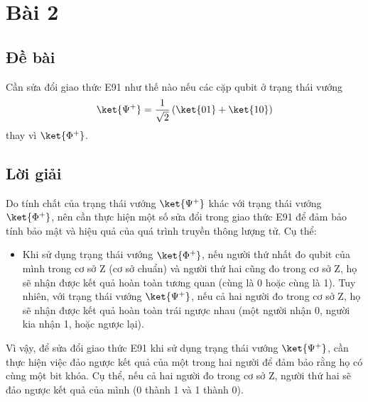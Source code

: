 \section{Bài 2}

\subsection{Đề bài}

Cần sửa đổi giao thức E91 như thế nào nếu các cặp qubit ở trạng thái vướng
\[
\ket{\Psi^+} = \frac{1}{\sqrt{2}}\left( \ket{01} + \ket{10} \right)
\]
thay vì $\ket{\Phi^+}$.

\subsection{Lời giải}

Do tính chất của trạng thái vướng $\ket{\Psi^+}$ khác với trạng thái vướng $\ket{\Phi^+}$, nên cần thực hiện một số sửa đổi trong giao thức E91 để đảm bảo tính bảo mật và hiệu quả của quá trình truyền thông lượng tử. Cụ thể:

\begin{itemize}
    \item Khi sử dụng trạng thái vướng $\ket{\Phi^+}$, nếu người thứ nhất đo qubit của mình trong cơ sở Z (cơ sở chuẩn) và người thứ hai cũng đo trong cơ sở Z, họ sẽ nhận được kết quả hoàn toàn tương quan (cùng là 0 hoặc cùng là 1). Tuy nhiên, với trạng thái vướng $\ket{\Psi^+}$, nếu cả hai người đo trong cơ sở Z, họ sẽ nhận được kết quả hoàn toàn trái ngược nhau (một người nhận 0, người kia nhận 1, hoặc ngược lại).
\end{itemize}

Vì vậy, để sửa đổi giao thức E91 khi sử dụng trạng thái vướng $\ket{\Psi^+}$, cần thực hiện việc đảo ngược kết quả của một trong hai người để đảm bảo rằng họ có cùng một bit khóa. Cụ thể, nếu cả hai người đo trong cơ sở Z, người thứ hai sẽ đảo ngược kết quả của mình (0 thành 1 và 1 thành 0).